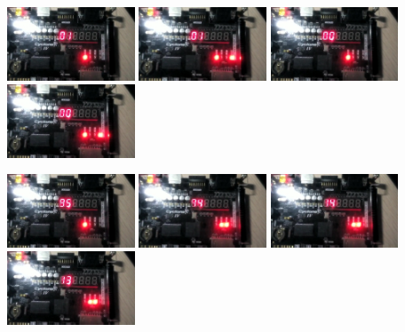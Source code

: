 \documentclass[12pt,a4paper]{article}
\begin{document}
\begin{center}
\vspace*{0.25cm}
\includegraphics[width=3.8cm]{pic/test/9}
\includegraphics[width=3.8cm]{pic/test/10}
\includegraphics[width=3.8cm]{pic/test/11}
\includegraphics[width=3.8cm]{pic/test/12}

\vspace*{0.25cm}
\includegraphics[width=3.8cm]{pic/test/13}
\includegraphics[width=3.8cm]{pic/test/14}
\includegraphics[width=3.8cm]{pic/test/15}
\includegraphics[width=3.8cm]{pic/test/16}
\end{center}
\end{document}
